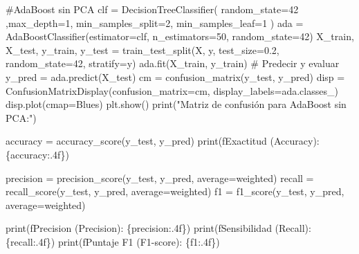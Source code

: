 \documentclass[
  letterpaper,
  DIV=11,
  numbers=noendperiod]{scrartcl}
\newenvironment{Shaded}{\begin{snugshade}}{\end{snugshade}}
\newcommand{\BuiltInTok}[1]{\textcolor[rgb]{0.00,0.23,0.31}{#1}}
\newcommand{\CommentTok}[1]{\textcolor[rgb]{0.37,0.37,0.37}{#1}}
\newcommand{\DecValTok}[1]{\textcolor[rgb]{0.68,0.00,0.00}{#1}}
\newcommand{\FloatTok}[1]{\textcolor[rgb]{0.68,0.00,0.00}{#1}}
\newcommand{\NormalTok}[1]{\textcolor[rgb]{0.00,0.23,0.31}{#1}}
\newcommand{\OperatorTok}[1]{\textcolor[rgb]{0.37,0.37,0.37}{#1}}
\newcommand{\SpecialCharTok}[1]{\textcolor[rgb]{0.37,0.37,0.37}{#1}}
\newcommand{\SpecialStringTok}[1]{\textcolor[rgb]{0.13,0.47,0.30}{#1}}
\newcommand{\StringTok}[1]{\textcolor[rgb]{0.13,0.47,0.30}{#1}}
\begin{document}
\begin{Shaded}
\begin{Highlighting}[]
\CommentTok{\#AdaBoost sin PCA}
\NormalTok{clf }\OperatorTok{=}\NormalTok{ DecisionTreeClassifier(}
\NormalTok{  random\_state}\OperatorTok{=}\DecValTok{42}\NormalTok{ ,max\_depth}\OperatorTok{=}\DecValTok{1}\NormalTok{,}
\NormalTok{  min\_samples\_split}\OperatorTok{=}\DecValTok{2}\NormalTok{,}
\NormalTok{  min\_samples\_leaf}\OperatorTok{=}\DecValTok{1}
\NormalTok{)}
\NormalTok{ada }\OperatorTok{=}\NormalTok{ AdaBoostClassifier(estimator}\OperatorTok{=}\NormalTok{clf, n\_estimators}\OperatorTok{=}\DecValTok{50}\NormalTok{, random\_state}\OperatorTok{=}\DecValTok{42}\NormalTok{)}
\NormalTok{X\_train, X\_test, y\_train, y\_test }\OperatorTok{=}
\NormalTok{  train\_test\_split(X, y, test\_size}\OperatorTok{=}\FloatTok{0.2}\NormalTok{, random\_state}\OperatorTok{=}\DecValTok{42}\NormalTok{, stratify}\OperatorTok{=}\NormalTok{y)}
\NormalTok{ada.fit(X\_train, y\_train)}
\CommentTok{\# Predecir y evaluar}
\NormalTok{y\_pred }\OperatorTok{=}\NormalTok{ ada.predict(X\_test)}
\NormalTok{cm }\OperatorTok{=}\NormalTok{ confusion\_matrix(y\_test, y\_pred)}
\NormalTok{disp }\OperatorTok{=}\NormalTok{ ConfusionMatrixDisplay(confusion\_matrix}\OperatorTok{=}\NormalTok{cm, display\_labels}\OperatorTok{=}\NormalTok{ada.classes\_)}
\NormalTok{disp.plot(cmap}\OperatorTok{=}\StringTok{\textquotesingle{}Blues\textquotesingle{}}\NormalTok{)}
\NormalTok{plt.show()}
\BuiltInTok{print}\NormalTok{(}\StringTok{"Matriz de confusión para AdaBoost sin PCA:"}\NormalTok{)}

\NormalTok{accuracy }\OperatorTok{=}\NormalTok{ accuracy\_score(y\_test, y\_pred)}
\BuiltInTok{print}\NormalTok{(}\SpecialStringTok{f\textquotesingle{}Exactitud (Accuracy): }\SpecialCharTok{\{}\NormalTok{accuracy}\SpecialCharTok{:.4f\}}\SpecialStringTok{\textquotesingle{}}\NormalTok{)}

\NormalTok{precision }\OperatorTok{=}\NormalTok{ precision\_score(y\_test, y\_pred, average}\OperatorTok{=}\StringTok{\textquotesingle{}weighted\textquotesingle{}}\NormalTok{)}
\NormalTok{recall }\OperatorTok{=}\NormalTok{ recall\_score(y\_test, y\_pred, average}\OperatorTok{=}\StringTok{\textquotesingle{}weighted\textquotesingle{}}\NormalTok{)}
\NormalTok{f1 }\OperatorTok{=}\NormalTok{ f1\_score(y\_test, y\_pred, average}\OperatorTok{=}\StringTok{\textquotesingle{}weighted\textquotesingle{}}\NormalTok{)}

\BuiltInTok{print}\NormalTok{(}\SpecialStringTok{f\textquotesingle{}Precision (Precision): }\SpecialCharTok{\{}\NormalTok{precision}\SpecialCharTok{:.4f\}}\SpecialStringTok{\textquotesingle{}}\NormalTok{)}
\BuiltInTok{print}\NormalTok{(}\SpecialStringTok{f\textquotesingle{}Sensibilidad (Recall): }\SpecialCharTok{\{}\NormalTok{recall}\SpecialCharTok{:.4f\}}\SpecialStringTok{\textquotesingle{}}\NormalTok{)}
\BuiltInTok{print}\NormalTok{(}\SpecialStringTok{f\textquotesingle{}Puntaje F1 (F1{-}score): }\SpecialCharTok{\{}\NormalTok{f1}\SpecialCharTok{:.4f\}}\SpecialStringTok{\textquotesingle{}}\NormalTok{)}
\end{Highlighting}
\end{Shaded}
\end{document}
